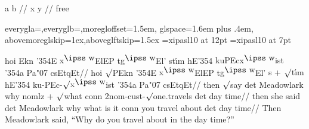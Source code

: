 

\ex
\begingl
\gla a b //
\glb x y //
\glft free
\endgl
\xe

%
   {everygla=\ips,everyglb=\ips,moregloffset=1.5em,
   glspace=1.6em plus .4em,
   abovemoreglskip=1ex,aboveglftskip=1.5ex}
\font\ips=xipasl10 at 12pt
\font\ipss=xipasl10 at 7pt
\def\mroot{$\surd$}
\def\L{\char'354}
\def\v#1{{\accent"07 #1}}
\def\C{{\accent"07 c}}
\def\W{$^{\hbox{\ipss w}}\mskip-2mu$}


\ex[lingstyle=ips-gloss]
\begingl[everygl={\rightskip=0pt plus 1fil}]
\gla hoi Ekn {\L}E {x\W}ElEP t{g\W}El' st{\'\i}m
   {hE\L} {kuPEcx\W ist} {\L a} Pa{\v c}sEtqEt//
\glb hoi {\mroot}PEkn {\L}E {x\W}ElEP t{g\W}El' {s + \mroot t\'\i m}
   {hE\L} ku-PEc-\mroot{x\W}ist {\L}a Pa{\v c}sEtqEt//
\glc then {\mroot}say det Meadowlark why
      {nomlz + \mroot what} conn
   2nom-cust-{\mroot}one.travels det {day time}//
\glc then {she said} det Meadowlark why {what is it}
   conn {you travel about} det {day time}//
\glft Then Meadowlark said, ``Why do you travel about in the day
time?''
\endgl
\xe

